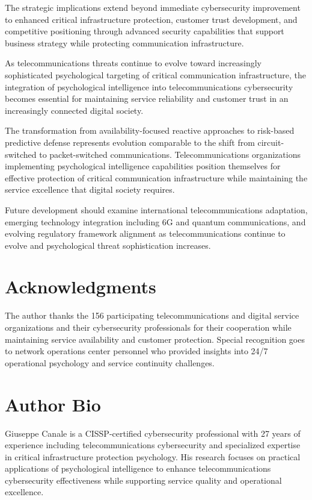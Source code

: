 \documentclass[10pt, twocolumn]{article}
\begin{document}
The strategic implications extend beyond immediate cybersecurity improvement to enhanced critical infrastructure protection, customer trust development, and competitive positioning through advanced security capabilities that support business strategy while protecting communication infrastructure.

As telecommunications threats continue to evolve toward increasingly sophisticated psychological targeting of critical communication infrastructure, the integration of psychological intelligence into telecommunications cybersecurity becomes essential for maintaining service reliability and customer trust in an increasingly connected digital society.

The transformation from availability-focused reactive approaches to risk-based predictive defense represents evolution comparable to the shift from circuit-switched to packet-switched communications. Telecommunications organizations implementing psychological intelligence capabilities position themselves for effective protection of critical communication infrastructure while maintaining the service excellence that digital society requires.

Future development should examine international telecommunications adaptation, emerging technology integration including 6G and quantum communications, and evolving regulatory framework alignment as telecommunications continue to evolve and psychological threat sophistication increases.

\section*{Acknowledgments}

The author thanks the 156 participating telecommunications and digital service organizations and their cybersecurity professionals for their cooperation while maintaining service availability and customer protection. Special recognition goes to network operations center personnel who provided insights into 24/7 operational psychology and service continuity challenges.

\section*{Author Bio}

Giuseppe Canale is a CISSP-certified cybersecurity professional with 27 years of experience including telecommunications cybersecurity and specialized expertise in critical infrastructure protection psychology. His research focuses on practical applications of psychological intelligence to enhance telecommunications cybersecurity effectiveness while supporting service quality and operational excellence.
\end{document}

